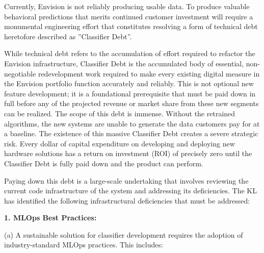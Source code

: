 \documentclass[11pt,a4paper]{article}
\begin{document}
Currently, Envision is not reliably producing usable data. To produce valuable behavioral predictions that merits continued customer investment will require a monumental engineering effort that constitutes resolving a form of technical debt heretofore described as ”Classifier Debt”.

While technical debt refers to the accumulation of effort required to refactor the Envision infrastructure, Classifier Debt is the accumulated body of essential, non-negotiable redevelopment work required to make every existing digital measure in the Envision portfolio function accurately and reliably. This is not optional new feature development; it is a foundational prerequisite that must be paid down in full before any of the projected revenue or market share from these new segments can be realized. The scope of this debt is immense. Without the retrained algorithms, the new systems are unable to generate the data customers pay for at a baseline. The existence of this massive Classifier Debt creates a severe strategic risk. Every dollar of capital expenditure on developing and deploying new hardware solutions has a return on investment (ROI) of precisely zero until the Classifier Debt is fully paid down and the product can perform.

Paying down this debt is a large-scale undertaking that involves reviewing the current code infrastructure of the system and addressing its deficiencies. The KL has identified the following infrastructural deficiencies that must be addressed:

\textbf{1. MLOps Best Practices:}

(a) A sustainable solution for classifier development requires the adoption of industry-standard MLOps practices. This includes:
\end{document}
